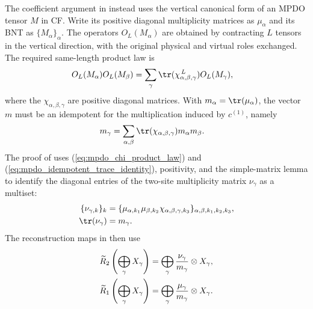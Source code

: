 \begin{remark}
    The coefficient argument in
    \cite[Appendix~C.4]{Cirac2016MPDO_arXiv} instead uses the vertical
    canonical form of an MPDO tensor $M$ in CF. Write its positive diagonal
    multiplicity matrices as $\mu_\alpha$ and its BNT as
    $\{M_\alpha\}_\alpha$. The operators $O_L(M_\alpha)$ are obtained by
    contracting $L$ tensors in the vertical direction, with the original
    physical and virtual roles exchanged. The required same-length product
    law is
    \begin{align}
        O_L(M_\alpha)O_L(M_\beta)
         & =
        \sum_\gamma
        \tr(\chi_{\alpha,\beta,\gamma}^{\,L})
        O_L(M_\gamma),
        \label{eq:mpdo_chi_product_law}
    \end{align}
    where the $\chi_{\alpha,\beta,\gamma}$ are positive diagonal matrices.
    With $m_\alpha=\tr(\mu_\alpha)$, the vector $m$ must be an idempotent
    for the multiplication induced by $c^{(1)}$, namely
    \begin{align}
        m_\gamma
         & =
        \sum_{\alpha,\beta}
        \tr(\chi_{\alpha,\beta,\gamma})
        m_\alpha m_\beta.
        \label{eq:mpdo_idempotent_trace_identity}
    \end{align}
    The proof of \cite[Theorem~4.14]{Cirac2016MPDO_arXiv} uses
    (\ref{eq:mpdo_chi_product_law}) and (\ref{eq:mpdo_idempotent_trace_identity}),
    positivity, and the simple-matrix lemma
    \cite[lines~1155--1163]{Cirac2016MPDO_arXiv} to identify the diagonal
    entries of the two-site multiplicity matrix $\nu_\gamma$ as a multiset:
    \begin{align}
        \{\nu_{\gamma,k}\}_k
         & =
        \{\mu_{\alpha,k_1}\mu_{\beta,k_2}
        \chi_{\alpha,\beta,\gamma,k_3}\}_{\alpha,\beta,k_1,k_2,k_3},
        \notag        \\
        \tr(\nu_\gamma)
         & =m_\gamma.
        \label{eq:mpdo_nu_chi_witness}
    \end{align}
    The reconstruction maps in \cite[lines~2065--2085]{Cirac2016MPDO_arXiv}
    then use
    \begin{align}
        \widetilde R_2\left(\bigoplus_\gamma X_\gamma\right)
         & = \bigoplus_\gamma
        \frac{\nu_\gamma}{m_\gamma}\otimes X_\gamma,
        \notag                \\
        \widetilde R_1\left(\bigoplus_\gamma X_\gamma\right)
         & = \bigoplus_\gamma
        \frac{\mu_\gamma}{m_\gamma}\otimes X_\gamma.
        \label{eq:mpdo_reconstruction_maps}
    \end{align}

\end{remark}
